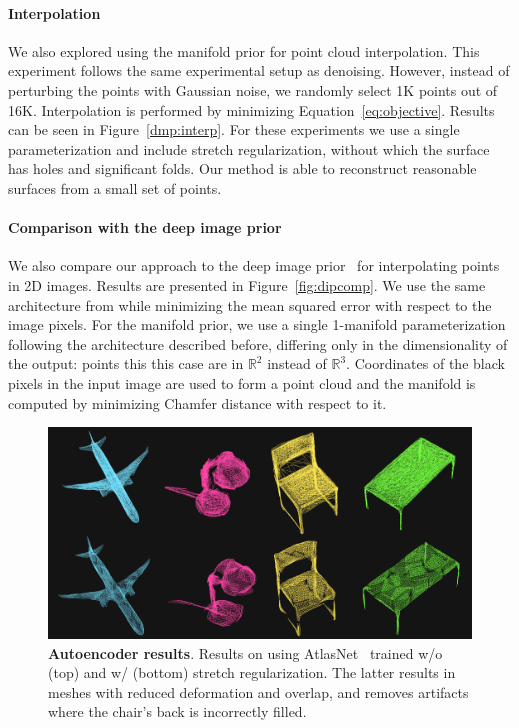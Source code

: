 \paragraph*{Interpolation} We also explored using the manifold prior for point cloud interpolation.
This experiment follows the same experimental setup as denoising.
However, instead of perturbing the points with Gaussian noise, we randomly select 1K points out of 16K.
Interpolation is performed by minimizing Equation~\ref{eq:objective}.
Results can be seen in Figure~\ref{dmp:interp}.
For these experiments we use a single parameterization and include stretch regularization, without which the surface has holes and significant folds.
Our method is able to reconstruct reasonable surfaces from a small
set of points.

\paragraph*{Comparison with the deep image prior}
We also compare our approach to the deep image prior~\cite{dip} for interpolating points in 2D
images.
Results are presented in Figure~\ref{fig:dipcomp}.
We use the same architecture from \cite{dip} while minimizing
the mean squared error with respect to the image pixels.
For the manifold prior, we use a single 1-manifold parameterization following
the architecture described before, differing only in the dimensionality of the output: points this this case are in $\mathbb{R}^2$ instead of $\mathbb{R}^3$.
Coordinates of the black pixels in the input image are used to form a point cloud and 
the manifold is computed by minimizing Chamfer distance with respect to it.

\begin{figure}
\centering
\includegraphics[width=0.8\linewidth]{dmp/imgs/aestretch.pdf}
    \caption{\label{fig:aestretch} \small \textbf{Autoencoder results}.
    Results on using AtlasNet~\cite{atlasnet} trained w/o (top) and w/ (bottom) stretch regularization.
    The latter results in meshes with reduced deformation and overlap, and removes artifacts where the chair's back is incorrectly filled.
}
\end{figure}

